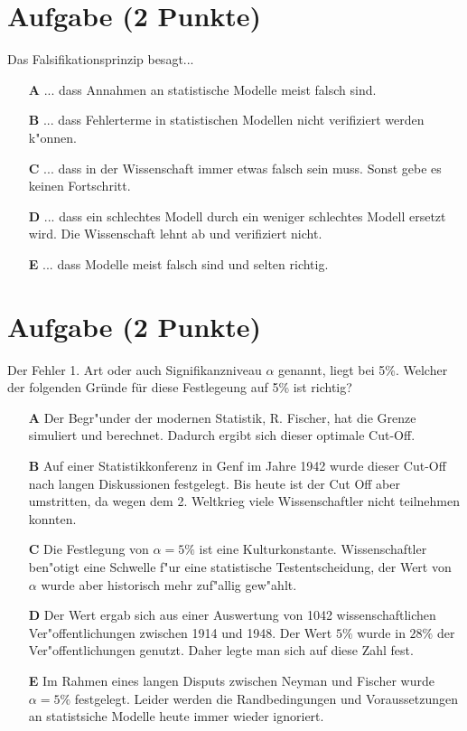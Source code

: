 \documentclass[a4paper, 10pt]{scrartcl}\usepackage[]{graphicx}\usepackage[]{xcolor}
\begin{document}
\section{Aufgabe \hfill (2 Punkte)}

Das Falsifikationsprinzip besagt... 



\begin{enumerate}
\item [\textbf{A} \msquare] ... dass Annahmen an statistische Modelle meist falsch sind.
\item [\textbf{B} \msquare] ... dass Fehlerterme in statistischen Modellen nicht verifiziert werden k{"o}nnen.
\item [\textbf{C} \msquare] ... dass in der Wissenschaft immer etwas falsch sein muss. Sonst gebe es keinen Fortschritt.
\item [\textbf{D} \msquare] ... dass ein schlechtes Modell durch ein weniger schlechtes Modell ersetzt wird. Die Wissenschaft lehnt ab und verifiziert nicht.
\item [\textbf{E} \msquare] ... dass Modelle meist falsch sind und selten richtig.
\end{enumerate}

\section{Aufgabe \hfill (2 Punkte)}

Der Fehler 1. Art oder auch Signifikanzniveau $\alpha$ genannt, liegt bei
5\%. Welcher der folgenden Gr{\"u}nde f{\"u}r diese Festlegeung auf 5\% ist richtig?



\begin{enumerate}
\item [\textbf{A} \msquare] Der Begr{"u}nder der modernen Statistik, R. Fischer, hat die Grenze simuliert und berechnet. Dadurch ergibt sich dieser optimale Cut-Off.
\item [\textbf{B} \msquare] Auf einer Statistikkonferenz in Genf im Jahre 1942 wurde dieser Cut-Off nach langen Diskussionen festgelegt. Bis heute ist der Cut Off aber umstritten, da wegen dem 2. Weltkrieg viele Wissenschaftler nicht teilnehmen konnten.
\item [\textbf{C} \msquare] Die Festlegung von $\alpha = 5\%$ ist eine Kulturkonstante. Wissenschaftler ben{"o}tigt eine Schwelle f{"u}r eine statistische Testentscheidung, der Wert von $\alpha$ wurde aber historisch mehr zuf{"a}llig gew{"a}hlt.
\item [\textbf{D} \msquare] Der Wert ergab sich aus einer Auswertung von 1042 wissenschaftlichen Ver{"o}ffentlichungen zwischen 1914 und 1948. Der Wert $5\%$ wurde in $28\%$ der Ver{"o}ffentlichungen genutzt. Daher legte man sich auf diese Zahl fest.
\item [\textbf{E} \msquare] Im Rahmen eines langen Disputs zwischen Neyman und Fischer wurde $\alpha = 5\%$ festgelegt. Leider werden die Randbedingungen und Voraussetzungen an statistsiche Modelle heute immer wieder ignoriert.
\end{enumerate}
\end{document}
